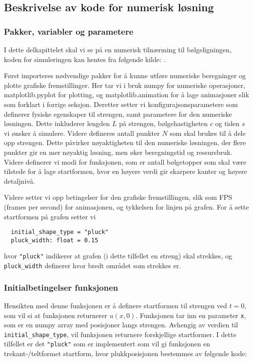 \subsection{Beskrivelse av kode for numerisk løsning}
\subsubsection{Pakker, variabler og parametere}
I dette delkapittelet skal vi se på en numerisk tilnærming til bølgeligningen, koden for simuleringen kan hentes fra 
følgende kilde: \parencite{simuleringKode}. 

Først importeres nødvendige pakker for å kunne utføre numeriske beregninger og plotte grafiske fremstillinger. Her
tar vi i bruk numpy for numeriske operasjoner, matplotlib.pyplot for plotting, og matplotlib.animation for å lage 
animasjoner slik som forklart i forrige seksjon. Deretter setter vi konfigurajsonsparametere som definerer
fysiske egenskaper til strengen, samt parametere for den numeriske løsningen. Dette inkluderer lengden $L$ på strengen,
bølgehastigheten $c$ og tiden $s$ vi ønsker å simulere. Videre defineres antall punkter $N$ som skal brukes til å dele 
opp strengen. Dette påvirker nøyaktigheten til den numeriske løsningen, der flere punkter gir en mer nøyaktig løsning,
men øker beregningstid og ressursbruk. Videre definerer vi modi for funksjonen, som er antall bølgetopper som skal være 
tilstede for å lage startformen, hvor en høyere verdi gir skarpere kanter og høyere detaljnivå. 

Videre setter vi opp betingelser for den grafiske fremstillingen, slik som FPS (frames per second) for animasjonen, og
tykkelsen for linjen på grafen. For å sette startformen på grafen setter vi 

\begin{lstlisting}
  initial_shape_type = "pluck"
  pluck_width: float = 0.15
\end{lstlisting}

hvor \verb|"pluck"| indikerer at grafen (i dette tilfellet en streng) skal strekkes, og \verb|pluck_width| definerer hvor bredt området som strekkes er.

\subsubsection{Initialbetingelser funksjonen}
Hensikten med denne funksjonen er å definere startformen til strengen ved $t=0$, som vil si at funksjonen returnerer $u(x,0)$.
Funksjonen tar inn en parameter \verb|x|, som er en numpy array med posisjoner langs strengen. Avhengig av verdien til
\verb|initial_shape_type|, vil funksjonen returnere forskjellige startformer. I dette tilfellet er det \verb|"pluck"| 
som er implementert som vil gi funksjonen en trekant-/teltformet startform, hvor plukkposisjonen bestemmes av følgende 
kode:

